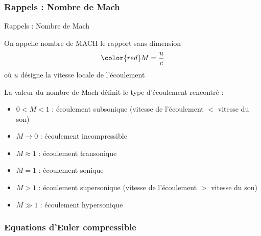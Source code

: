 \subsubsection{Rappels : Nombre de Mach}
\begin{frame}{Rappels : Nombre de Mach}

\small

On appelle \textcolor{vert}{nombre de MACH} le rapport sans dimension
\[
	\color{red}
	M = \frac{u}{c}
\]
où $u$ désigne la vitesse locale de l'écoulement %

\medskip
\pause


\bigskip
\pause

La valeur du nombre de Mach définit le type d'écoulement rencontré :

\smallskip

\begin{itemize}
\item
	$0 < M <1$ : écoulement \textcolor{vert}{subsonique} (vitesse de l'écoulement $<$ vitesse du son)
\item
	$M \rightarrow 0$ : écoulement \textcolor{vert}{incompressible}
\item
	$M \approx 1$ : écoulement \textcolor{vert}{transonique}
\item
	$M=1$ : écoulement \textcolor{vert}{sonique}
\item
	$M > 1$ : écoulement \textcolor{vert}{supersonique} (vitesse de l'écoulement $>$ vitesse du son)
\item
	$M \gg 1$ : écoulement \textcolor{vert}{hypersonique}
\end{itemize}

\vspace{0mm}

\end{frame}





\subsubsection{Equations d'Euler compressible}

